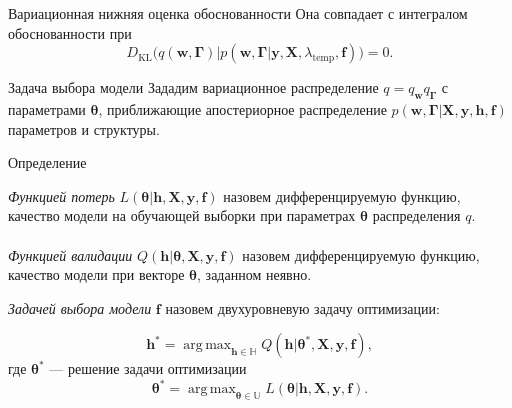 \documentclass[usenames,dvipsnames,11pt,pdf,utf8,russian,aspectratio=43]{beamer}
\DeclareMathOperator*{\argmax}{arg\,max}
\begin{document}
\begin{frame}{Вариационная нижняя оценка обоснованности}
Она совпадает с интегралом обоснованности при $$D_\text{KL}\bigl(q(\mathbf{w}, \boldsymbol{\Gamma})|p\left(\mathbf{w}, \boldsymbol{\Gamma}|\mathbf{y}, \mathbf{X}, \lambda_\text{temp},\mathbf{f}\right)\bigr)=0.$$

\end{frame}      


\begin{frame}{Задача выбора модели}
\footnotesize
Зададим вариационное распределение $q=q_\mathbf{w}q_{\boldsymbol{\Gamma}}$ с параметрами $\boldsymbol{\theta}$, приближающие апостериорное распределение $p(\mathbf{w}, \boldsymbol{\Gamma}|\mathbf{X}, \mathbf{y}, \mathbf{h}, \mathbf{f})$ параметров и структуры.



\begin{block}{Определение}

\textit{Функцией потерь} $L( \boldsymbol{\theta}| \mathbf{h}, \mathbf{X}, \mathbf{y}, \mathbf{f})$   назовем дифференцируемую функцию, качество модели на обучающей выборки при параметрах $\boldsymbol{\theta}$ распределения $q$.~\\~\\
\textit{Функцией валидации} $Q(\mathbf{h}| \boldsymbol{\theta}, \mathbf{X}, \mathbf{y}, \mathbf{f} )$ назовем дифференцируемую функцию, качество модели при векторе $\boldsymbol{\theta}$, заданном неявно.
\end{block}
\begin{block}{}
\textit{Задачей выбора модели} $\mathbf{f}$ назовем двухуровневую задачу оптимизации:

\[
	\mathbf{h}^{*} = \argmax_{\mathbf{h} \in \mathbb{H}} Q(\mathbf{h}|  \boldsymbol{\theta}^{*}, \mathbf{X}, \mathbf{y}, \mathbf{f} ),
\]
где $\boldsymbol{\theta}^{*}$ --- решение задачи оптимизации
\[
   \boldsymbol{\theta}^{*} = \argmax_{\boldsymbol{\theta} \in \mathbb{U}} L(\boldsymbol{\theta}|  \mathbf{h},  \mathbf{X}, \mathbf{y}, \mathbf{f}).
\]
\end{block}


\end{frame}







                                                                                                              
\end{document}
